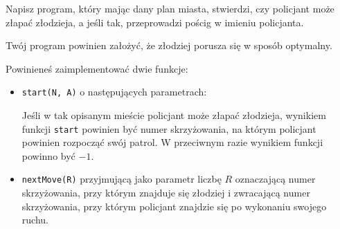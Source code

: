 \documentclass{boi2014-pl}
\renewcommand{\method}[1]{{\tt #1}}
\begin{document}
    \Task
    Napisz program, który mając dany plan miasta, stwierdzi, czy policjant może
    złapać złodzieja, a jeśli tak, przeprowadzi pościg w imieniu policjanta.

    Twój program powinien założyć, że złodziej porusza się w sposób optymalny.

    \Implementation
    Powinieneś zaimplementować dwie funkcje:
    \begin{itemize}
        \item \method{start(N, A)} o następujących parametrach:

        Jeśli w tak opisanym mieście policjant może złapać złodzieja,
        wynikiem funkcji \method{start} powinien być numer skrzyżowania,
        na którym policjant powinien rozpocząć swój patrol.
        W przeciwnym razie wynikiem funkcji powinno być $-1$.

        \item \method{nextMove(R)} przyjmującą jako parametr liczbę
            $R$ oznaczającą numer skrzyżowania, przy którym znajduje się złodziej
            i zwracającą numer skrzyżowania, przy którym policjant znajdzie się
            po wykonaniu swojego ruchu.
    \end{itemize}
\end{document}
